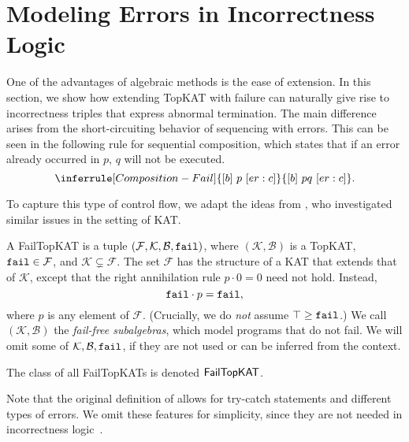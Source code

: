 \section{Modeling Errors in Incorrectness Logic}\label{sec: failkat and error}

One of the advantages of algebraic methods is the ease of extension.
In this section, we show how extending TopKAT with failure can naturally give rise to incorrectness triples that express abnormal termination.  
The main difference arises from the short-circuiting behavior of sequencing with errors.
This can be seen in the following rule for sequential composition, which states that if an error already occurred in \(p\), \(q\) will not be executed.
\[
\inferrule[Composition-Fail]
{ \incorTriple{b}{p}{\errState: c}}
{ \incorTriple{b}{pq}{\errState: c}}.
\]

To capture this type of control flow, we adapt the ideas from
\citet{Mamouras_2017}, who investigated similar issues
in the setting of KAT\@.
\begin{definition}[FailTopKAT]
  A FailTopKAT is a tuple \((\mathcal{F},\mathcal{K},\mathcal{B},\mathtt{fail})\), where
  \((\mathcal{K}, \mathcal{B})\) is a TopKAT, \(\mathtt{fail} \in \mathcal{F}\), and
  \(\mathcal{K} \subsetneq \mathcal{F}\). The set \(\mathcal{F}\) has the
  structure of a KAT that extends that of \(\mathcal{K}\), except that the right
  annihilation rule \(p \cdot 0 = 0\) need not hold.  Instead,
  \[\mathtt{fail} \cdot p = \mathtt{fail},\] where \(p\) is any element of \(\mathcal{F}\).
  (Crucially, we do \emph{not} assume \(\top \geq \mathtt{fail}\).) We call
  \((\mathcal{K},\mathcal{B})\) the \emph{fail-free subalgebras}, 
  which model programs that do not fail.  
  We will omit some of \(\mathcal{K},\mathcal{B},\mathtt{fail}\),
  if they are not used or can be inferred from the context.

  The class of all FailTopKATs is denoted \(\mathsf{FailTopKAT}\).
\end{definition}
Note that the original definition of \citet{Mamouras_2017} allows for try-catch statements and different types of errors.  
We omit these features for simplicity, since they are not needed in incorrectness logic~\cite{OHearn_2020}. 

